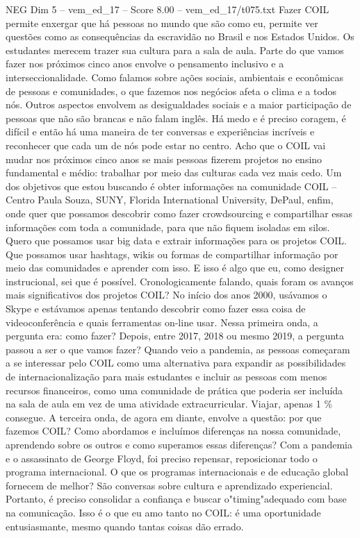 \begin{textsample}{NEG Dim 5 – vem\_ed\_17 – Score 8.00 – vem\_ed\_17/t075.txt}  \label{ex:f5_neg_036}
Fazer COIL permite enxergar que há pessoas no mundo que são como eu, permite ver questões como as consequências da escravidão no Brasil e nos Estados Unidos.
Os estudantes merecem trazer sua cultura para a sala de aula.
Parte do que vamos fazer nos próximos cinco anos envolve o pensamento inclusivo e a interseccionalidade.
Como falamos sobre ações sociais, ambientais e econômicas de pessoas e comunidades, o que fazemos nos negócios afeta o clima e a todos nós.
Outros aspectos envolvem as desigualdades sociais e a maior participação de pessoas que não são brancas e não falam inglês.
Há medo e é preciso coragem, é difícil e então há uma maneira de ter conversas e experiências incríveis e reconhecer que cada um de nós pode estar no centro.
Acho que o COIL vai mudar nos próximos cinco anos se mais pessoas fizerem projetos no ensino fundamental e médio: trabalhar por meio das culturas cada vez mais cedo.
Um dos objetivos que estou buscando é obter informações na comunidade COIL – Centro Paula Souza, SUNY, Florida International University, DePaul, enfim, onde quer que possamos descobrir como fazer crowdsourcing e compartilhar essas informações com toda a comunidade, para que não fiquem isoladas em silos.
Quero que possamos usar big data e extrair informações para os projetos COIL.
Que possamos usar hashtags, wikis ou formas de compartilhar informação por meio das comunidades e aprender com isso.
E isso é algo que eu, como designer instrucional, sei que é possível.
Cronologicamente falando, quais foram os avanços mais significativos dos projetos COIL?
No início dos anos 2000, usávamos o Skype e estávamos apenas tentando descobrir como fazer essa coisa de videoconferência e quais ferramentas on-line usar.
Nessa primeira onda, a pergunta era: como fazer?
Depois, entre 2017, 2018 ou mesmo 2019, a pergunta passou a ser o que vamos fazer?
Quando veio a pandemia, as pessoas começaram a se interessar pelo COIL como uma alternativa para expandir as possibilidades de internacionalização para mais estudantes e incluir as pessoas com menos recursos financeiros, como uma comunidade de prática que poderia ser incluída na sala de aula em vez de uma atividade extracurricular.
Viajar, apenas 1 \% consegue.
A terceira onda, de agora em diante, envolve a questão: por que fazemos COIL?
Como abordamos e incluímos diferenças na nossa comunidade, aprendendo sobre os outros e como superamos essas diferenças?
Com a pandemia e o assassinato de George Floyd, foi preciso repensar, reposicionar todo o programa internacional.
O que os programas internacionais e de educação global fornecem de melhor?
São conversas sobre cultura e aprendizado experiencial.
Portanto, é preciso consolidar a confiança e buscar o"timing"adequado com base na comunicação.
Isso é o que eu amo tanto no COIL: é uma oportunidade entusiasmante, mesmo quando tantas coisas dão errado.

\end{textsample}
